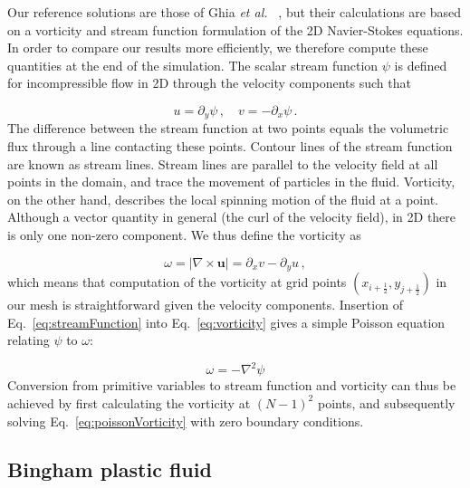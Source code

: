 \documentclass[final,3p,twocolumn]{elsarticle}
\begin{document}
Our reference solutions are those of Ghia {\em et al.\ } \cite{ghia1982high},
but their calculations are based on a vorticity and stream function formulation
of the 2D Navier-Stokes equations. In order to compare our results more
efficiently, we therefore compute these quantities at the end of the
simulation. The scalar stream function $\psi$ is defined for incompressible
flow in 2D through the velocity components such that 

\begin{equation}
    u = \partial_y \psi \,, \quad v = - \partial_x \psi \,.
    \label{eq:streamFunction}
\end{equation}
%
The difference between the stream function at two points equals the
volumetric flux through a line contacting these points. Contour lines of the
stream function are known as stream lines. Stream lines are parallel to the
velocity field at all points in the domain, and trace the movement of particles
in the fluid. Vorticity, on the other hand, describes the local spinning motion
of the fluid at a point. Although a vector quantity in general (the curl of the velocity
field), in 2D there is only one non-zero component. We thus define the
vorticity as 

\begin{equation}
    \omega = |\nabla \times \bm{u}| = \partial_x v - \partial_y u \,,
    \label{eq:vorticity}
\end{equation}
%
which means that computation of the vorticity at grid points
$(x_{i+\frac{1}{2}}, y_{j+\frac{1}{2}})$ in our mesh is straightforward
given the velocity components.  Insertion of Eq.\ \eqref{eq:streamFunction}
into Eq.\ \eqref{eq:vorticity} gives a simple Poisson equation relating $\psi$
to $\omega$: 

\begin{equation}
    \omega = - \nabla^2 \psi
    \label{eq:poissonVorticity}
\end{equation}
%
Conversion from primitive variables to stream function and vorticity can thus
be achieved by first calculating the vorticity at $(N-1)^2$ points, and
subsequently solving Eq.\ \eqref{eq:poissonVorticity} with zero boundary
conditions. 

\subsection{Bingham plastic fluid}
\label{subsec:bingham}
\end{document}
